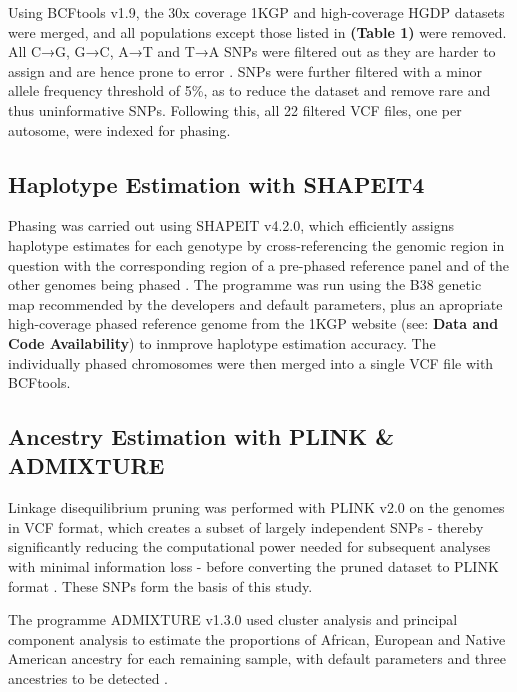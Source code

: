 \documentclass[11pt]{article}
\begin{document}
Using BCFtools v1.9, the 30x coverage 1KGP and high-coverage HGDP datasets were merged, and all populations except those listed in \textbf{(Table 1)} were removed. All C→G, G→C, A→T and T→A SNPs were filtered out as they are harder to assign and are hence prone to error \parencite{Danecek2021}. SNPs were further filtered with a minor allele frequency threshold of 5\%, as to reduce the dataset and remove rare and thus uninformative SNPs. Following this, all 22 filtered VCF files, one per autosome, were indexed for phasing. 








\subsection{Haplotype Estimation with SHAPEIT4}


Phasing was carried out using SHAPEIT v4.2.0, which efficiently assigns haplotype estimates for each genotype by cross-referencing the genomic region in question with the corresponding region of a pre-phased reference panel and of the other genomes being phased \parencite{Delaneau2019}. The programme was run using the B38 genetic map recommended by the developers and default parameters, plus an apropriate high-coverage phased reference genome from the 1KGP website (see: \textbf{Data and Code Availability}) to inmprove haplotype estimation accuracy. The individually phased chromosomes were then merged into a single VCF file with BCFtools. 





\subsection{Ancestry Estimation with PLINK \& ADMIXTURE}


Linkage disequilibrium pruning was performed with PLINK v2.0 on the genomes in VCF format, which creates a subset of largely independent SNPs - thereby significantly reducing the computational power needed for subsequent analyses with minimal information loss - before converting the pruned dataset to PLINK format \parencite{Purcell2007}. These SNPs form the basis of this study.

The programme ADMIXTURE v1.3.0 used cluster analysis and principal component analysis to estimate the proportions of African, European and Native American ancestry for each remaining sample, with default parameters and three ancestries to be detected \parencite{Alexander2009}.
\end{document}
